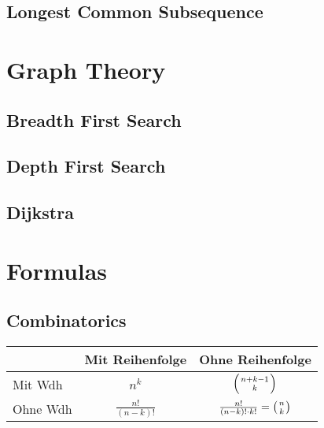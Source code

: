 \documentclass[11pt]{article}
\begin{document}
\subsection{Longest Common Subsequence}



\section{Graph Theory}

\subsection{Breadth First Search}


\subsection{Depth First Search}


\subsection{Dijkstra}



\section{Formulas}

\subsection{Combinatorics}
\begin{tabular}{ | l | c | c |}
  \hline
   & Mit Reihenfolge & Ohne Reihenfolge \\ \hline
   Mit Wdh & $n^k$ & $\left( {n+k-1} \atop k \right)$  \\ \hline
   Ohne Wdh & $\frac{n!}{\left( n-k \right) !}$ & $\frac{n!}{\left( n-k \right) !\cdot k!} = \left( n \atop k \right)$  \\ \hline
\end{tabular}
\end{document}
